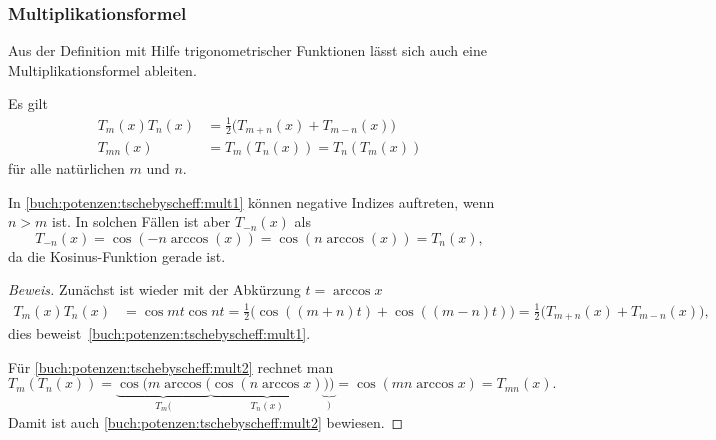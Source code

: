 %
%
\subsubsection{Multiplikationsformel}
Aus der Definition mit Hilfe trigonometrischer Funktionen
lässt sich auch eine Multiplikationsformel ableiten.
%

\begin{satz}
%
Es gilt
\begin{align}
T_m(x)T_n(x)&=\frac12\bigl(T_{m+n}(x) + T_{m-n}(x)\bigr)
\label{buch:potenzen:tschebyscheff:mult1}
\\
T_{mn}(x) &= T_m(T_n(x)) = T_n(T_m(x))
\label{buch:potenzen:tschebyscheff:mult2}
\end{align}
für alle natürlichen $m$ und $n$.
\end{satz}

In \eqref{buch:potenzen:tschebyscheff:mult1} können negative Indizes
auftreten, wenn $n>m$ ist.
In solchen Fällen ist aber $T_{-n}(x)$ als
\[
T_{-n}(x)
=
\cos(-n\arccos(x))
=
\cos(n\arccos(x))
=
T_n(x),
\]
da die Kosinus-Funktion gerade ist.

\begin{proof}[Beweis]
Zunächst ist wieder mit der Abkürzung $t=\arccos x$
\begin{align*}
T_m(x)T_n(x)
&=
\cos mt \cos nt
=
\frac12\bigl(\cos((m+n)t)+\cos((m-n)t)\bigr)
=
\frac12\bigl(
T_{m+n}(x) + T_{m-n}(x)
\bigr),
\end{align*}
dies beweist~\eqref{buch:potenzen:tschebyscheff:mult1}.

Für \eqref{buch:potenzen:tschebyscheff:mult2} rechnet man
\[
T_m(T_n(x))
=
\underbrace{\cos(m\arccos(}_{\displaystyle T_m(}\underbrace{\cos(n\arccos x)}_{\displaystyle T_n(x)}\underbrace{))}_{\displaystyle)}
=
\cos(mn\arccos x)
=
T_{mn}(x).
\]
Damit ist auch \eqref{buch:potenzen:tschebyscheff:mult2} bewiesen.
\end{proof}

%
%
